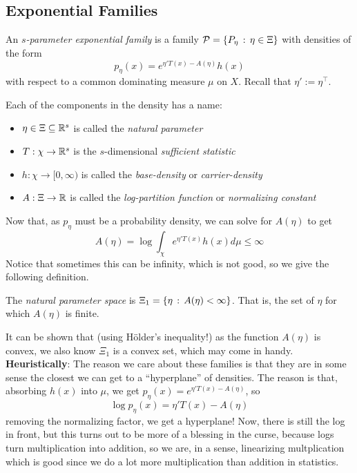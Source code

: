 
\subsection*{Exponential Families}
\sectionspace

\begin{definition}
    An \emph{$s$-parameter exponential family} is a family $\mathcal{P} = \{P_{\eta} \, :\, \eta \in \Xi\}$ with densities of the form
    \[ p_{\eta}(x) = e^{\eta'T(x) - A(\eta)}h(x) \]
    with respect to a common dominating measure $\mu$ on $X$. Recall that $\eta' := \eta^{\top}$. 
\end{definition}
Each of the components in the density has a name:
\begin{itemize}
    \item $\eta \in \Xi \subseteq \mathbb{R}^s$ is called the \emph{natural parameter}
    \item $T : \chi \to \mathbb{R}^{s}$ is the $s$-dimensional \emph{sufficient statistic}
    \item $h : \chi \to [0, \infty)$ is called the \emph{base-density} or \emph{carrier-density}
    \item $A : \Xi \to \mathbb{R}$ is called the \emph{log-partition function} or \emph{normalizing constant}
\end{itemize}
Now that, as $p_{\eta}$ must be a probability density, we can solve for $A(\eta)$ to get
\[ A(\eta) = \log \int_{\chi} e^{\eta'T(x)}h(x)d\mu \leq \infty \]
Notice that sometimes this can be infinity, which is not good, so we give the following definition.

\begin{definition}
    The \emph{natural parameter space} is $\Xi_{1} = \{\eta \, :\, A(\eta) < \infty\}$. That is, the set of $\eta$ for which $A(\eta)$ is finite.
\end{definition}

It can be shown that (using H\"older's inequality!) as the function $A(\eta)$ is convex, we also know $\Xi_1$ is a convex set, which may come in handy.\\

\textbf{Heuristically}: The reason we care about these families is that they are in some sense the closest we can get to a ``hyperplane'' of densities. The reason is that, absorbing $h(x)$ into $\mu$, we get $p_{\eta}(x) = e^{\eta'T(x) - A(\eta)}$, so
\[ \log p_{\eta}(x) = \eta'T(x) - A(\eta) \]
removing the normalizing factor, we get a hyperplane! Now, there is still the log in front, but this turns out to be more of a blessing in the curse, because logs turn multiplication into addition, so we are, in a sense, linearizing multplication which is good since we do a lot more multiplication than addition in statistics. 

